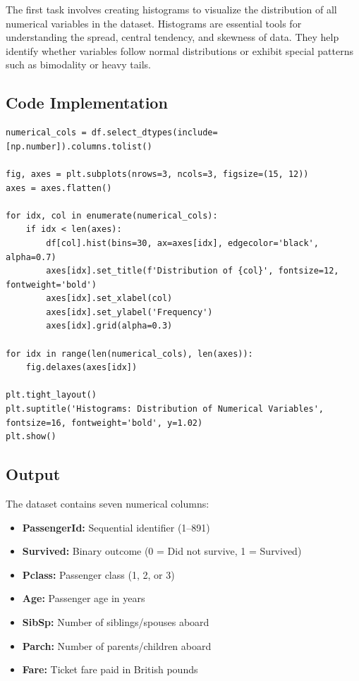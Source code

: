 \documentclass[12pt,a4paper]{article}
\begin{document}
The first task involves creating histograms to visualize the distribution of all numerical variables in the dataset. Histograms are essential tools for understanding the spread, central tendency, and skewness of data. They help identify whether variables follow normal distributions or exhibit special patterns such as bimodality or heavy tails.

\subsection{Code Implementation}

\begin{lstlisting}
numerical_cols = df.select_dtypes(include=[np.number]).columns.tolist()

fig, axes = plt.subplots(nrows=3, ncols=3, figsize=(15, 12))
axes = axes.flatten()

for idx, col in enumerate(numerical_cols):
    if idx < len(axes):
        df[col].hist(bins=30, ax=axes[idx], edgecolor='black', alpha=0.7)
        axes[idx].set_title(f'Distribution of {col}', fontsize=12, fontweight='bold')
        axes[idx].set_xlabel(col)
        axes[idx].set_ylabel('Frequency')
        axes[idx].grid(alpha=0.3)

for idx in range(len(numerical_cols), len(axes)):
    fig.delaxes(axes[idx])

plt.tight_layout()
plt.suptitle('Histograms: Distribution of Numerical Variables', fontsize=16, fontweight='bold', y=1.02)
plt.show()
\end{lstlisting}

\subsection{Output}

The dataset contains seven numerical columns:
\begin{itemize}
    \item \textbf{PassengerId:} Sequential identifier (1--891)
    \item \textbf{Survived:} Binary outcome (0 = Did not survive, 1 = Survived)
    \item \textbf{Pclass:} Passenger class (1, 2, or 3)
    \item \textbf{Age:} Passenger age in years
    \item \textbf{SibSp:} Number of siblings/spouses aboard
    \item \textbf{Parch:} Number of parents/children aboard
    \item \textbf{Fare:} Ticket fare paid in British pounds
\end{itemize}
\end{document}
